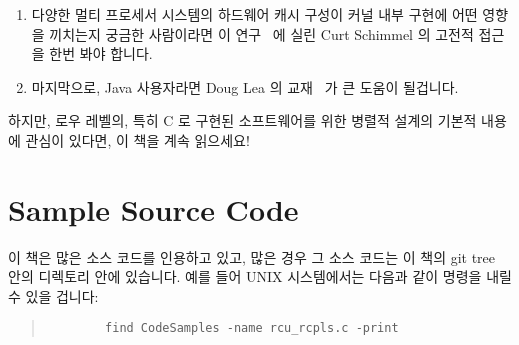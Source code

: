 \begin{enumerate}
\item	다양한 멀티 프로세서 시스템의 하드웨어 캐시 구성이 커널 내부 구현에
	어떤 영향을 끼치는지 궁금한 사람이라면 이
	연구~\cite{Schimmel:1994:USM:175689} 에 실린 Curt Schimmel 의 고전적
	접근을 한번 봐야 합니다.

\iffalse
\item	Those interested in learning how various types of multi-processor
	hardware
	cache organizations affect the implementation of kernel
	internals should take a look at Curt Schimmel's classic
	treatment of this subject~\cite{Schimmel:1994:USM:175689}.
\fi

\item	마지막으로, Java 사용자라면 Doug Lea 의
	교재~\cite{DougLea1997Textbook,Goetz2007Textbook} 가 큰 도움이
	될겁니다.

\iffalse
\item	Finally, those using Java might be well-served by Doug Lea's
	textbooks~\cite{DougLea1997Textbook,Goetz2007Textbook}.
\fi

\end{enumerate}

하지만, 로우 레벨의, 특히 C 로 구현된 소프트웨어를 위한 병렬적 설계의 기본적
내용에 관심이 있다면, 이 책을 계속 읽으세요!

\iffalse
However, if you are interested in principles of parallel design
for low-level software, especially software written in C, read on!
\fi

\section{Sample Source Code}
\label{sec:howto:Sample Source Code}

이 책은 많은 소스 코드를 인용하고 있고, 많은 경우 그 소스 코드는 이 책의 git
tree 안의  디렉토리 안에 있습니다.
예를 들어 UNIX 시스템에서는 다음과 같이 명령을 내릴 수 있을 겁니다:

\iffalse
This book discusses its fair share of source code, and in many cases
this source code may be found in the \co{CodeSamples} directory
of this book's git tree.
For example, on UNIX systems, you should be able to type the following:
\fi

\begin{quote}
	{\scriptsize
	\begin{verbatim}
		find CodeSamples -name rcu_rcpls.c -print
	\end{verbatim}
	}
\end{quote}

